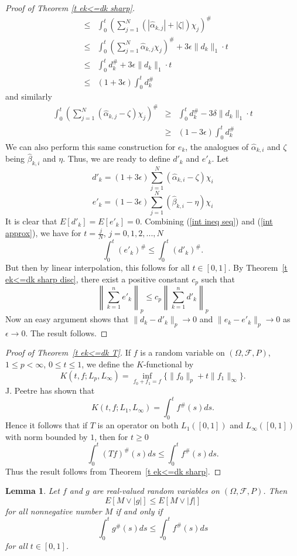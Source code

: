 \documentclass[12pt]{amsart}
\newtheorem{lem}{Lemma}
\begin{document}
\begin{proof}[Proof of Theorem \ref{t ek<=dk sharp}]
\begin{eqnarray}
& \leq &\int_0^t\left(\sum_{j=1}^N\left(|\hat{\alpha}_{k,j}|+|\zeta |\right)\chi _j \right)^\#\nonumber\\
& \leq &\int_0^t \left( \sum_{j=1}^N \hat{\alpha}_{k,j}\chi _j
\right)^\# +
3\epsilon \|d_k\|_1\cdot t\nonumber\\
& \leq & \int_0^t d_k^\# + 3\epsilon \|d_k\|_1\cdot t\nonumber\\
& \leq & (1+3\epsilon)\int_0^t d_k^\# \nonumber
\end{eqnarray}
and similarly
\begin{eqnarray}
\label{int approx}
\int_0^t \left(\sum_{j=1}^N\left(\hat{\alpha}_{k,j}-\zeta
\right)\chi _j \right)^\#
&\geq & \int_0^t d_k^\# - 3\delta\|d_k\|_1\cdot t\\
&\geq & (1-3\epsilon)\int_0^t d_k^\#\nonumber
\end{eqnarray}
We can also perform this same construction for $e_k$, the analogues of 
$\hat \alpha_{k,i}$ and $\zeta$ being $\hat\beta_{k,i}$ and $\eta$.
Thus, we are ready to define $d'_k$ and $e'_k$. Let
\[d'_k= (1+3\epsilon) \sum_{j=1}^N (\hat{\alpha }_{k,i}-\zeta )\chi_i \]
\[e'_k= (1-3\epsilon) \sum_{j=1}^N (\hat{\beta }_{k,i}-\eta )\chi _i\]
It is clear that $E[d'_k]=E[e'_k]=0 $. 
Combining (\ref{int ineq seq}) and (\ref{int approx}), we
have for $t=\frac{j}{N}$, $j=0,1,2,...,N$
\[ \int_0^t (e'_k)^\# \leq \int_0^t (d'_k)^\# . \]
But then by linear interpolation, this follows for all $t \in [0,1]$.
By Theorem~\ref{t ek<=dk sharp disc}, 
there exist a positive constant $c_p$ such
that
\[ \left\|\sum_{k=1}^n e'_k \right\|_p 
   \leq c_p \left\| \sum_{k=1}^n d'_k \right\|_p\]
Now an easy argument shows that $\| d_k - d'_k \|_p \to 0$ and
$\| e_k - e'_k \|_p \to 0$ as $\epsilon \to 0$.
The result follows.
\end{proof}

\begin{proof}[Proof of Theorem~\ref{t ek<=dk T}]
If $f$ is a random variable on $(\Omega ,\mathcal{F},P)$, $1\leq
p<\infty$, $0\leq t\leq 1$, we define the $K$-functional by
\[K(t,f;L_p,L_\infty)=\inf_{f_0+f_1=f}\{\|f_0\|_p+t\|f_1\|_\infty \}.\]
J. Peetre \cite{P} has shown that
\[K(t,f;L_1,L_\infty) = \int_0^t f^{\#} (s)ds .\]
Hence it follows that if $T$ is an operator on both $L_1([0,1])$ 
and $L_\infty([0,1])$ with norm bounded by $1$, then for $t \ge 0$
\[ \int_0^t (Tf)^{\#}(s) ds \le \int_0^t f^{\#}(s) ds . \]
Thus the result follows from
Theorem~\ref{t ek<=dk sharp}.
\end{proof}

\begin{lem}
\label{l Mg<=Mf}
Let $f$ and $g$ are real-valued random variables on
$(\Omega ,\mathcal{F},P)$.  Then 
\begin{equation}
\label{Mg<=Mf}
E \left[ M \vee |g| \right]\leq E\left[M \vee |f| \right]
\end{equation}
for all nonnegative number $M$  if and
only if 
\[\int_0^t g^{\#}(s) ds\leq \int_0^t f^{\#}(s) ds \]
for all $t\in [0,1]$.
\end{lem}
\end{document}
